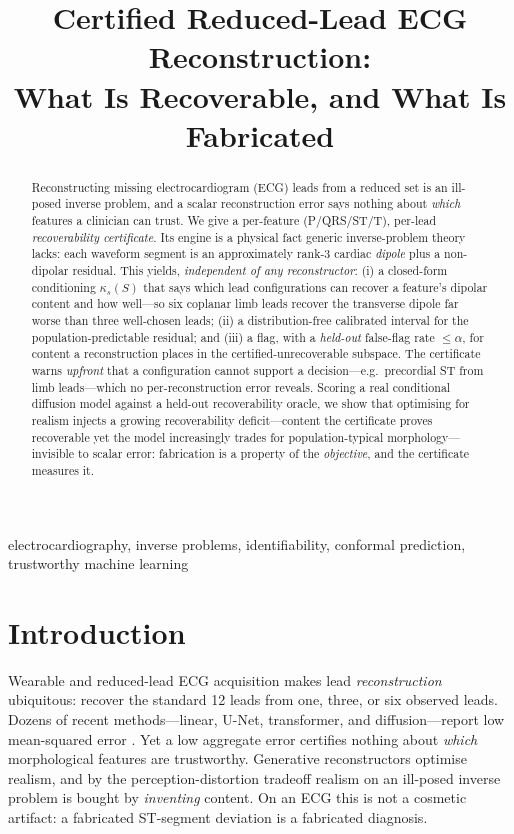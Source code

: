 \documentclass{article}
\title{Certified Reduced-Lead ECG Reconstruction:\\
What Is Recoverable, and What Is Fabricated}
\begin{document}
\maketitle

\begin{abstract}
Reconstructing missing electrocardiogram (ECG) leads from a reduced set is an
ill-posed inverse problem, and a scalar reconstruction error says nothing about
\emph{which} features a clinician can trust. We give a per-feature (P/QRS/ST/T),
per-lead \emph{recoverability certificate}. Its engine is a physical fact generic
inverse-problem theory lacks: each waveform segment is an approximately rank-3 cardiac
\emph{dipole} plus a non-dipolar residual. This yields, \emph{independent of any
reconstructor}: (i) a closed-form conditioning $\kappa_s(S)$ that says which lead
configurations can recover a feature's dipolar content and how well---so six coplanar
limb leads recover the transverse dipole far worse than three well-chosen leads; (ii)
a distribution-free calibrated interval for the population-predictable residual; and
(iii) a flag, with a \emph{held-out} false-flag rate $\le\alpha$, for content a
reconstruction places in the certified-unrecoverable subspace. The certificate warns
\emph{upfront} that a configuration cannot support a decision---e.g.\ precordial ST
from limb leads---which no per-reconstruction error reveals. Scoring a real
conditional diffusion model against a held-out recoverability oracle, we show that
optimising for realism injects a growing recoverability deficit---content the
certificate proves recoverable yet the model increasingly trades for population-typical
morphology---invisible to scalar error: fabrication is a property of the
\emph{objective}, and the certificate measures it.
\end{abstract}

\begin{keywords}
electrocardiography, inverse problems, identifiability, conformal prediction,
trustworthy machine learning
\end{keywords}

\section{Introduction}
\label{sec:intro}

Wearable and reduced-lead ECG acquisition makes lead \emph{reconstruction}
ubiquitous: recover the standard 12 leads from one, three, or six observed leads.
Dozens of recent methods---linear, U-Net, transformer, and diffusion---report low
mean-squared error \cite{cardoso2024bayesian}. Yet a low
aggregate error certifies nothing about \emph{which} morphological features are
trustworthy. Generative reconstructors optimise realism, and by the
perception-distortion tradeoff \cite{blau2018perception} realism on an ill-posed
inverse problem is bought by \emph{inventing} content. On an ECG this is not a
cosmetic artifact: a fabricated ST-segment deviation is a fabricated diagnosis.
\end{document}
